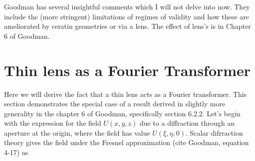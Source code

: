 \documentclass[../../main.tex]{subfiles}
\begin{document}
Goodman has several insightful comments which I will not delve into now. They include the (more stringent) limitations of regimes of validity and how these are ameliorated by ceratin geometries or via a lens. The effect of lens's is in Chapter 6 of Goodman. 

\section{Thin lens as a Fourier Transformer} 
Here we will derive the fact that a thin lens acts as a Fourier transformer. This section demonstrates the special case of a result derived in slightly more generality in the chapter 6 of Goodman, specifically section 6.2.2.
Let's begin with the expression for the field $U(x,y,z)$ due to a diffraction through an aperture at the origin, where the field has value $U(\xi,\eta,0)$. Scalar difrraction theory gives the field under the Fresnel approximation (cite Goodman, equation 4-17) as 
\end{document}
